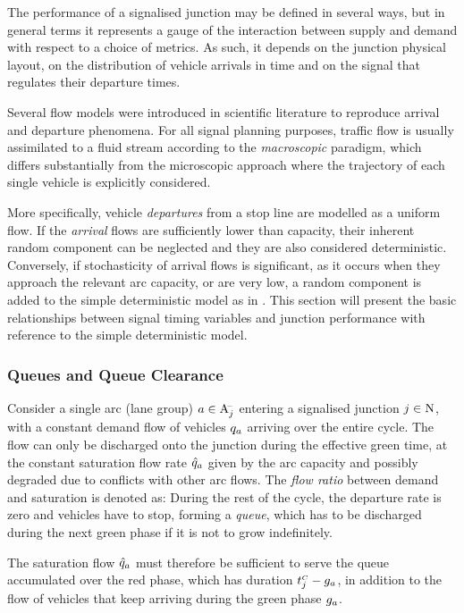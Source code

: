 The performance of a signalised junction may be defined in several ways, but in general terms it represents a gauge of the interaction between supply and demand with respect to a choice of metrics. As such, it depends on the junction physical layout, on the distribution of vehicle arrivals in time and on the signal that regulates their departure times. 

Several flow models were introduced in scientific literature to reproduce arrival and departure phenomena.
For all signal planning purposes, traffic flow is usually assimilated to a fluid stream according to the \emph{macroscopic} paradigm, which differs substantially from the microscopic approach where the trajectory of each single vehicle is explicitly considered.

More specifically, vehicle \emph{departures} from a stop line are modelled as a uniform flow. If the \emph{arrival} flows are sufficiently lower than capacity, their inherent random component can be neglected and they are also considered deterministic.
Conversely, if stochasticity of arrival flows is significant, as it occurs when they approach the relevant arc capacity, or are very low, a random component is added to the simple deterministic model as in \citep{webster1958traffic}.
This section will present the basic relationships between signal timing variables and junction performance with reference to the simple deterministic model.

\subsubsection*{Queues and Queue Clearance}
Consider a single arc (lane group) $a \in \mathrm{A}_{j}^{\scriptscriptstyle{\hspace{-2pt}-}}$ entering a signalised junction $j \in \mathrm{N}$, with a constant demand flow of vehicles $q_a$ arriving over the entire cycle. The flow can only be discharged onto the junction during the effective green time, at the constant saturation flow rate $\hat{q}_a$ given by the arc capacity and possibly degraded due to conflicts with other arc flows. The \emph{flow ratio} between demand and saturation is denoted as:
During the rest of the cycle, the departure rate is zero and vehicles have to stop, forming a \emph{queue}, which has to be discharged during the next green phase if it is not to grow indefinitely. 

The saturation flow $\hat{q}_a$ must therefore be sufficient to serve the queue accumulated over the red phase, which has duration $t_{j}^{\scriptscriptstyle{C}}-g_{a}$, in addition to the flow of vehicles that keep arriving during the green phase $g_{a}$.

